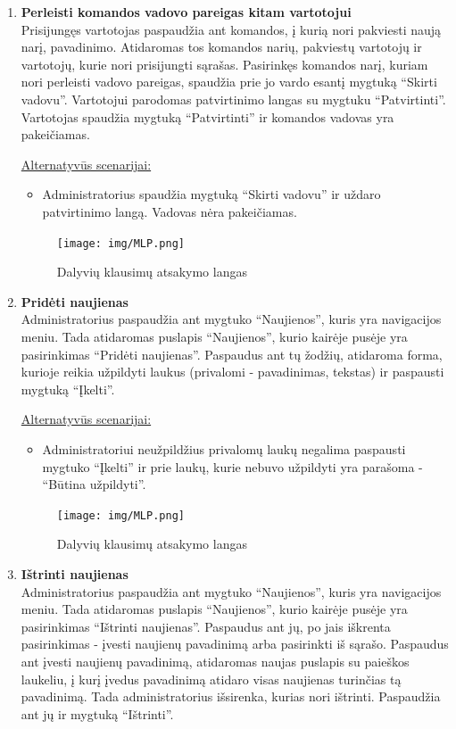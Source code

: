 \documentclass{VUMIFPSkursinis}
\begin{document}
\begin{enumerate} [label = \textbf{U\arabic*.}]
			\item \textbf{Perleisti komandos vadovo pareigas kitam vartotojui}   \\
					Prisijungęs vartotojas paspaudžia ant komandos, į kurią nori pakviesti naują narį, pavadinimo. Atidaromas tos komandos narių, pakviestų vartotojų ir vartotojų, kurie nori prisijungti sąrašas. Pasirinkęs komandos narį, kuriam nori perleisti vadovo pareigas, spaudžia prie jo vardo esantį mygtuką “Skirti vadovu”. Vartotojui parodomas patvirtinimo langas su mygtuku “Patvirtinti”. Vartotojas spaudžia mygtuką “Patvirtinti” ir komandos vadovas yra pakeičiamas.
					
					\underline{Alternatyvūs scenarijai:}
					\begin{itemize}
						\item Administratorius spaudžia mygtuką “Skirti vadovu” ir uždaro patvirtinimo langą. Vadovas nėra pakeičiamas.
					\end{itemize}
				
				\begin{figure}[H]
					\centering
					\texttt{[image: img/MLP.png]}
					\caption{Dalyvių klausimų atsakymo langas}
					\label{fig:atsakyti-klausimus}
				\end{figure}
								
			\item \textbf{Pridėti naujienas}   \\
					Administratorius paspaudžia ant mygtuko “Naujienos”, kuris yra navigacijos meniu. Tada atidaromas puslapis “Naujienos”, kurio kairėje pusėje yra pasirinkimas “Pridėti naujienas”. Paspaudus ant tų žodžių, atidaroma forma, kurioje reikia užpildyti laukus (privalomi - pavadinimas, tekstas) ir paspausti mygtuką “Įkelti”.
					
					\underline{Alternatyvūs scenarijai:}
					\begin{itemize}
						\item Administratoriui neužpildžius privalomų laukų negalima paspausti mygtuko “Įkelti” ir prie laukų, kurie nebuvo užpildyti yra parašoma - “Būtina užpildyti”.
					\end{itemize}
				
				\begin{figure}[H]
					\centering
					\texttt{[image: img/MLP.png]}
					\caption{Dalyvių klausimų atsakymo langas}
					\label{fig:atsakyti-klausimus}
				\end{figure}
					
			\item \textbf{Ištrinti naujienas}   \\
					Administratorius paspaudžia ant mygtuko “Naujienos”, kuris yra navigacijos meniu. Tada atidaromas puslapis “Naujienos”, kurio kairėje pusėje yra pasirinkimas “Ištrinti naujienas”. Paspaudus ant jų, po jais iškrenta pasirinkimas - įvesti naujienų pavadinimą arba pasirinkti iš sąrašo. Paspaudus ant įvesti naujienų pavadinimą, atidaromas naujas puslapis su paieškos laukeliu, į kurį įvedus pavadinimą atidaro visas naujienas turinčias tą pavadinimą. Tada administratorius išsirenka, kurias nori ištrinti. Paspaudžia ant jų ir mygtuką “Ištrinti”.
					

\end{enumerate}
\end{document}
